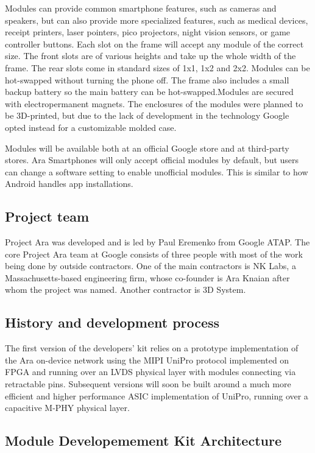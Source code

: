 Modules can provide common smartphone features, such as cameras and speakers, but can also provide more specialized features, such as medical devices, receipt printers, laser pointers, pico projectors, night vision sensors, or game controller buttons. Each slot on the frame will accept any module of the correct size. The front slots are of various heights and take up the whole width of the frame. The rear slots come in standard sizes of 1x1, 1x2 and 2x2. Modules can be hot-swapped without turning the phone off. The frame also includes a small backup battery so the main battery can be hot-swapped.Modules are secured with electropermanent magnets. The enclosures of the modules were planned to be 3D-printed, but due to the lack of development in the technology Google opted instead for a customizable molded case.

Modules will be available both at an official Google store and at third-party stores. Ara Smartphones will only accept official modules by default, but users can change a software setting to enable unofficial modules. This is similar to how Android handles app installations.

\subsection{Project team}

Project Ara was developed and is led by Paul Eremenko from Google ATAP. The core Project Ara team at Google consists of three people with most of the work being done by outside contractors. One of the main contractors is NK Labs, a Massachusetts-based engineering firm, whose co-founder is Ara Knaian after whom the project was named. Another contractor is 3D System.

\subsection{History and development process}

The first version of the developers' kit relies on a prototype implementation of the Ara on-device network using the MIPI UniPro protocol implemented on FPGA and running over an LVDS physical layer with modules connecting via retractable pins. Subsequent versions will soon be built around a much more efficient and higher performance ASIC implementation of UniPro, running over a capacitive M-PHY physical layer.
         
\subsection{Module Developemement Kit Architecture}

